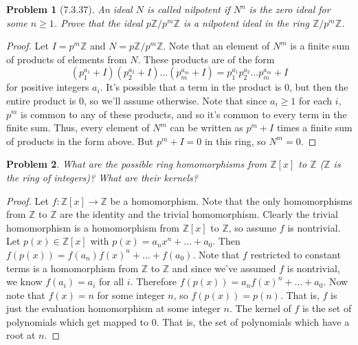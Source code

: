 \documentclass{article}
\newtheorem{problem}{Problem}
\begin{document}
\begin{problem}[7.3.37]
An ideal $N$ is called \emph{nilpotent} if $N^n$ is the zero ideal for some $n \geq 1$. Prove that the ideal $p\mathbb{Z}/p^m\mathbb{Z}$ is a nilpotent ideal in the ring $\mathbb{Z}/p^m\mathbb{Z}$.
\end{problem}
\begin{proof}
Let $I = p^m\mathbb{Z}$ and $N = p\mathbb{Z}/p^m\mathbb{Z}$. Note that an element of $N^m$ is a finite sum of products of elements from $N$. These products are of the form
\[
(p_1^{a_1} + I)(p_2^{a_2} + I) \dots (p_m^{a_m} + I) = p_1^{a_1}p_2^{a_2} \dots p_m^{a_m} + I
\]
for positive integers $a_i$. It's possible that a term in the product is $0$, but then the entire product is $0$, so we'll assume otherwise. Note that since $a_i \geq 1$ for each $i$, $p^m$ is common to any of these products, and so it's common to every term in the finite sum. Thus, every element of $N^m$ can be written as $p^m + I$ times a finite sum of products in the form above. But $p^m + I = 0$ in this ring, so $N^m = 0$.
\end{proof}

\begin{problem}
What are the possible ring homomorphisms from $\mathbb{Z}[x]$ to $\mathbb{Z}$ ($\mathbb{Z}$ is the ring of integers)? What are their kernels?
\end{problem}
\begin{proof}
Let $f : \mathbb{Z}[x] \to \mathbb{Z}$ be a homomorphism. Note that the only homomorphisms from $\mathbb{Z}$ to $\mathbb{Z}$ are the identity and the trivial homomorphism. Clearly the trivial homomorphism is a homomorphism from $\mathbb{Z}[x]$ to $\mathbb{Z}$, so assume $f$ is nontrivial. Let $p(x) \in \mathbb{Z}[x]$ with $p(x) = a_nx^n + \dots + a_0$. Then $f(p(x)) = f(a_n)f(x)^n + \dots + f(a_0)$. Note that $f$ restricted to constant terms is a homomorphism from $\mathbb{Z}$ to $\mathbb{Z}$ and since we've assumed $f$ is nontrivial, we know $f(a_i) = a_i$ for all $i$. Therefore $f(p(x)) = a_nf(x)^n + \dots + a_0$. Now note that $f(x) = n$ for some integer $n$, so $f(p(x)) = p(n)$. That is, $f$ is just the evaluation homomorphism at some integer $n$. The kernel of $f$ is the set of polynomials which get mapped to $0$. That is, the set of polynomials which have a root at $n$.
\end{proof}
\end{document}
